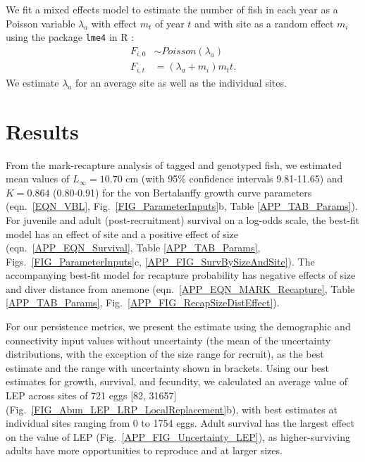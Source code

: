 \documentclass[12pt, oneside]{article}   	%
\begin{document}
We fit a mixed effects model to estimate the number of fish in each year as a Poisson variable $\lambda_a$ with effect $m_t$ of year $t$ and with site as a random effect $m_i$ using the package \texttt{lme4} in R \citep{lme42015package}:
\begin{equation} \label{EQN_Abundance}
\begin{split}
F_{i,0} & \sim Poisson(\lambda_a) \\
F_{i,t} & = (\lambda_a + m_i)m_t t.
\end{split}
\end{equation}
We estimate $\lambda_a$ for an average site as well as the individual sites. %


\section*{Results}  
From the mark-recapture analysis of tagged and genotyped fish, we estimated mean values of $L_\infty = 10.70$ cm (with 95\% confidence intervals 9.81-11.65) and $K = 0.864$ (0.80-0.91) for the von Bertalanffy growth curve parameters (eqn.\ \ref{EQN_VBL}, Fig.\ \ref{FIG_ParameterInputs}b, Table \ref{APP_TAB_Params}). For juvenile and adult (post-recruitment) survival on a log-odds scale, the best-fit model has an effect of site and a positive effect of size (eqn.\ \ref{APP_EQN_Survival}, Table \ref{APP_TAB_Params}, Figs.\ \ref{FIG_ParameterInputs}c, \ref{APP_FIG_SurvBySizeAndSite}). The accompanying best-fit model for recapture probability has negative effects of size and diver distance from anemone (eqn.\ \ref{APP_EQN_MARK_Recapture}, Table \ref{APP_TAB_Params}, Fig.\ \ref{APP_FIG_RecapSizeDistEffect}).

For our persistence metrics, we present the estimate using the demographic and connectivity input values without uncertainty (the mean of the uncertainty distributions, with the exception of the size range for recruit), as the best estimate and the range with uncertainty shown in brackets. Using our best estimates for growth, survival, and fecundity, we calculated an average value of LEP across sites of 721 eggs [82, 31657] (Fig.\ \ref{FIG_Abun_LEP_LRP_LocalReplacement}b), with best estimates at individual sites ranging from 0 to 1754 eggs. Adult survival has the largest effect on the value of LEP (Fig.\ \ref{APP_FIG_Uncertainty_LEP}), as higher-surviving adults have more opportunities to reproduce and at larger sizes. %
\end{document}
